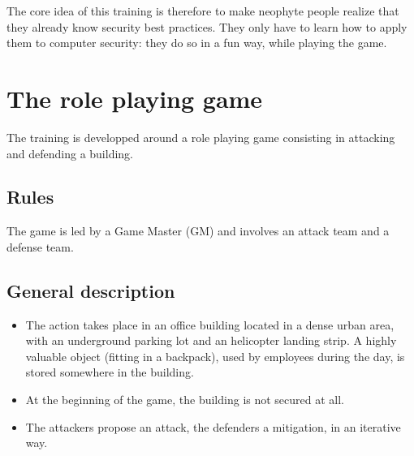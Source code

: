 \documentclass[11pt]{article} %
\begin{document}
The core idea of this training is therefore to make neophyte people realize 
that they already know security best practices. They only have to learn how 
to apply them to computer security: they do so in a fun way, while playing 
the game. 


\section{The role playing game}
The training is developped around a role playing game consisting in 
attacking and defending a building.


\subsection{Rules}
The game is led by a Game Master (GM) and involves an attack team and a defense team.

\subsection{General description}

\begin{itemize} 
\item The action takes place in an office building located in a dense urban area, 
with an underground parking lot and an helicopter landing strip. A
highly valuable object (fitting in a backpack), used by
employees during the day, is stored somewhere in the building.
\item At the beginning of the game, the building is not secured
at all.
\item The attackers propose an attack, the defenders a
mitigation, in an iterative way.
\end{itemize}
\end{document}
